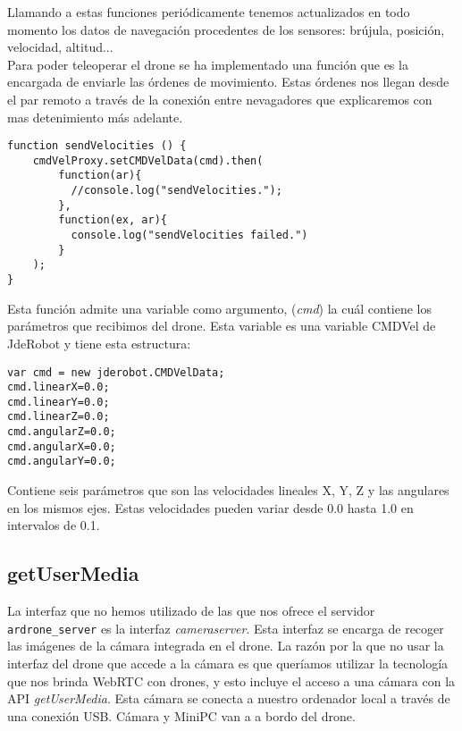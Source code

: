 Llamando a estas funciones periódicamente tenemos actualizados en todo momento los datos de navegación procedentes de los sensores: brújula, posición, velocidad, altitud...\\

Para poder teleoperar el drone se ha implementado una función que es la encargada de enviarle las órdenes de movimiento. Estas órdenes nos llegan desde el par remoto a través de la conexión entre nevagadores que explicaremos con mas detenimiento más adelante.\\

\begin{lstlisting}[caption=Función manejadora de las órdenes.]
function sendVelocities () {
    cmdVelProxy.setCMDVelData(cmd).then(
        function(ar){
          //console.log("sendVelocities.");
        },
        function(ex, ar){
          console.log("sendVelocities failed.")
        }
    );
}
\end{lstlisting}

Esta función admite una variable como argumento, (\emph{cmd}) la cuál contiene los parámetros que recibimos del drone. Esta variable es una variable CMDVel de JdeRobot y tiene esta estructura:\\

\begin{lstlisting}[caption=Variable CMD]
var cmd = new jderobot.CMDVelData; 
cmd.linearX=0.0;
cmd.linearY=0.0;
cmd.linearZ=0.0;
cmd.angularZ=0.0;
cmd.angularX=0.0;
cmd.angularY=0.0;
\end{lstlisting}

Contiene seis parámetros que son las velocidades lineales X, Y, Z y las angulares en los mismos ejes. Estas velocidades pueden variar desde 0.0 hasta 1.0 en intervalos de 0.1.\\


\subsection{getUserMedia}

La interfaz que no hemos utilizado de las que nos ofrece el servidor \texttt{ardrone\_server} es la interfaz \emph{cameraserver}. Esta interfaz se encarga de recoger las imágenes de la cámara integrada en el drone. La razón por la que no usar la interfaz del drone que accede a la cámara es que queríamos utilizar la tecnología que nos brinda WebRTC con drones, y esto incluye el acceso a una cámara con la API \emph{getUserMedia}. Esta cámara se conecta a nuestro ordenador local a través de una conexión USB. Cámara y MiniPC van a a bordo del drone.\\

